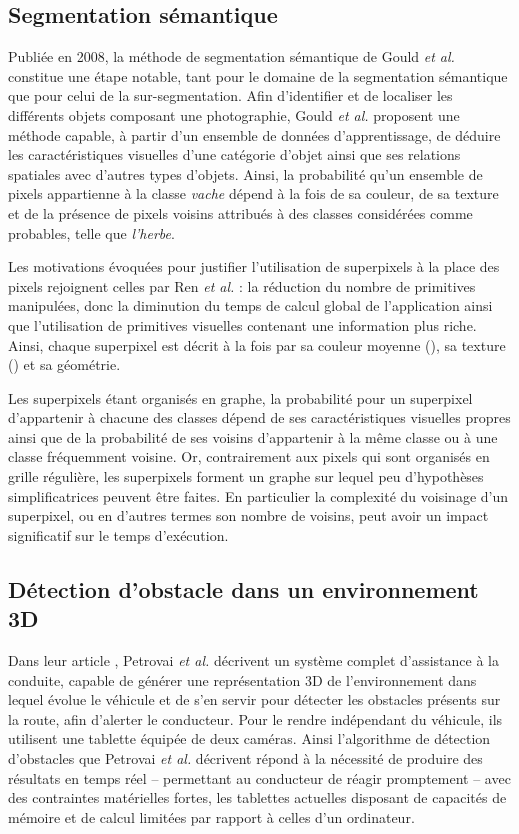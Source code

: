 \subsection{Segmentation sémantique}
Publiée en 2008, la méthode de segmentation sémantique de Gould \textit{et al.} \cite{gould2008multi} constitue une étape notable,  tant pour le domaine de la segmentation sémantique que pour celui de la sur-segmentation. Afin d'identifier et de localiser les différents objets composant une photographie, Gould \textit{et al.} proposent une méthode capable, à partir d'un ensemble de données d'apprentissage, de déduire les caractéristiques visuelles d'une catégorie d'objet ainsi que ses relations spatiales avec d'autres types d'objets. Ainsi, la probabilité qu'un ensemble de pixels appartienne à la classe \emph{vache} dépend à la fois de sa couleur, de sa texture et de la présence de pixels voisins attribués à des classes considérées comme probables, telle que \emph{l'herbe}. 

Les motivations évoquées pour justifier l'utilisation de superpixels à la place des pixels rejoignent celles  par Ren \textit{et al.} \cite{ren2003learning} : la réduction du nombre de primitives manipulées, donc la diminution du temps de calcul global de l'application ainsi que l'utilisation de primitives visuelles contenant une information plus riche. Ainsi, chaque superpixel est décrit à la fois par sa couleur moyenne (), sa texture () et sa géométrie. 

Les superpixels étant organisés en graphe, la probabilité pour un superpixel d'appartenir à chacune des classes dépend de ses caractéristiques visuelles propres ainsi que de la probabilité de ses voisins d'appartenir à la même classe ou à une classe fréquemment voisine. Or, contrairement aux pixels qui sont organisés en grille régulière, les superpixels forment un graphe sur lequel peu d'hypothèses simplificatrices peuvent être faites. En particulier\modif{,} la complexité du voisinage d'un superpixel, ou\modif{,} en d'autres termes\modif{,} son nombre de voisins, peut avoir un impact significatif sur le temps d'exécution. 

\subsection{Détection d'obstacle dans un environnement 3D}
Dans leur article \cite{petrovai2014obstacle}, Petrovai \textit{et al.} décrivent un système complet d’assistance à la conduite, capable de générer une représentation 3D de l'environnement dans lequel évolue le véhicule et de s'en servir pour détecter les obstacles présents sur la route, afin d'alerter le conducteur. Pour le rendre indépendant du véhicule, ils utilisent une tablette équipée de deux caméras. Ainsi\modif{,} l'algorithme de détection d'obstacles que Petrovai \textit{et al.} \cite{petrovai2014obstacle} décrivent répond à la nécessité de produire des résultats en temps réel -- permettant au conducteur de réagir promptement -- avec des contraintes matérielles fortes, les tablettes actuelles disposant de capacités de mémoire et de calcul limitées par rapport à celles d'un ordinateur. 

